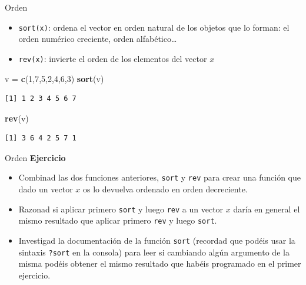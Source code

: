 \documentclass[
  ignorenonframetext,
]{beamer}
\newenvironment{Shaded}{\begin{snugshade}}{\end{snugshade}}
\newcommand{\DecValTok}[1]{\textcolor[rgb]{0.00,0.00,0.81}{#1}}
\newcommand{\FunctionTok}[1]{\textcolor[rgb]{0.13,0.29,0.53}{\textbf{#1}}}
\newcommand{\NormalTok}[1]{#1}
\newcommand{\OtherTok}[1]{\textcolor[rgb]{0.56,0.35,0.01}{#1}}
\providecommand{\tightlist}{%
  \setlength{\itemsep}{0pt}\setlength{\parskip}{0pt}}
\begin{document}
\begin{frame}[fragile]{Orden}
\label{orden}
\begin{itemize}
\tightlist
\item
  \texttt{sort(x)}: ordena el vector en orden natural de los objetos que
  lo forman: el orden numérico creciente, orden alfabético\ldots{}
\item
  \texttt{rev(x)}: invierte el orden de los elementos del vector \(x\)
\end{itemize}

\begin{Shaded}
\begin{Highlighting}[]
\NormalTok{v }\OtherTok{=} \FunctionTok{c}\NormalTok{(}\DecValTok{1}\NormalTok{,}\DecValTok{7}\NormalTok{,}\DecValTok{5}\NormalTok{,}\DecValTok{2}\NormalTok{,}\DecValTok{4}\NormalTok{,}\DecValTok{6}\NormalTok{,}\DecValTok{3}\NormalTok{)}
\FunctionTok{sort}\NormalTok{(v)}
\end{Highlighting}
\end{Shaded}

\begin{verbatim}
[1] 1 2 3 4 5 6 7
\end{verbatim}

\begin{Shaded}
\begin{Highlighting}[]
\FunctionTok{rev}\NormalTok{(v)}
\end{Highlighting}
\end{Shaded}

\begin{verbatim}
[1] 3 6 4 2 5 7 1
\end{verbatim}
\end{frame}

\begin{frame}[fragile]{Orden}
\label{orden-1}
\textbf{Ejercicio}

\begin{itemize}
\item
  Combinad las dos funciones anteriores, \texttt{sort} y \texttt{rev}
  para crear una función que dado un vector \(x\) os lo devuelva
  ordenado en orden decreciente.
\item
  Razonad si aplicar primero \texttt{sort} y luego \texttt{rev} a un
  vector \(x\) daría en general el mismo resultado que aplicar primero
  \texttt{rev} y luego \texttt{sort}.
\item
  Investigad la documentación de la función \texttt{sort} (recordad que
  podéis usar la sintaxis \texttt{?sort} en la consola) para leer si
  cambiando algún argumento de la misma podéis obtener el mismo
  resultado que habéis programado en el primer ejercicio.
\end{itemize}
\end{frame}
\end{document}
